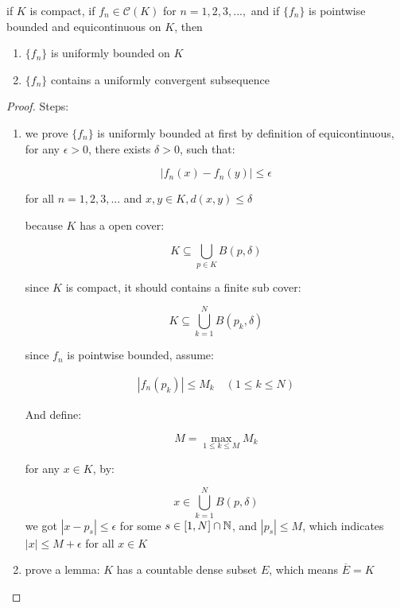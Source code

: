 \begin{thm}
    if $K$ is compact, if $f_n \in \mathscr{C}(K)$ for $n= 1,2,3,...,$
    and if $\{ f_n\}$ is pointwise bounded and equicontinuous on $K$, then

    \begin{enumerate}
        \item $\{ f_n\}$ is uniformly bounded on $K$

        \item $\{ f_n\}$ contains a uniformly convergent subsequence
    \end{enumerate}
\end{thm}

\begin{proof}
    Steps:

    \begin{enumerate}
        \item we prove $\{ f_n\}$ is uniformly bounded at first
    by definition of equicontinuous, for any $\epsilon > 0$, there exists $\delta > 0$,
    such that:

    \[
        \left| f_n(x) - f_n(y) \right| \le \epsilon
    \]

    for all $n = 1,2,3,...$ and $x,y \in K, d(x,y) \le \delta$

    because $K$ has a open cover:

    \[
        K \subseteq \bigcup_{p \in K}B(p, \delta)
    \]

    since $K$ is compact, it should contains a finite sub cover:

    \[
        K \subseteq \bigcup_{k=1}^{N}B(p_k, \delta)
    \]

    since $f_n$ is pointwise bounded, assume:

    \begin{align*}
        \left| f_n(p_k) \right| \le M_k \quad (1 \le k \le N)
    \end{align*}

    And define:

    \[
        M = \max_{1 \le k \le M}M_k
    \]

    for any $x \in K$, by:

    \[
        x \in \bigcup_{k=1}^{N}B(p, \delta)
    \]
    we got $| x - p_s| \le \epsilon$ for some $s \in [1,N] \cap \mathbb{N}$, and $\left|p_s \right| \le M$,
    which indicates $|x| \le M + \epsilon$ for all $x \in K$

    \item prove a lemma: $K$ has a countable dense subset $E$, which means $\overline{E} = K$


\end{enumerate}
\end{proof}
